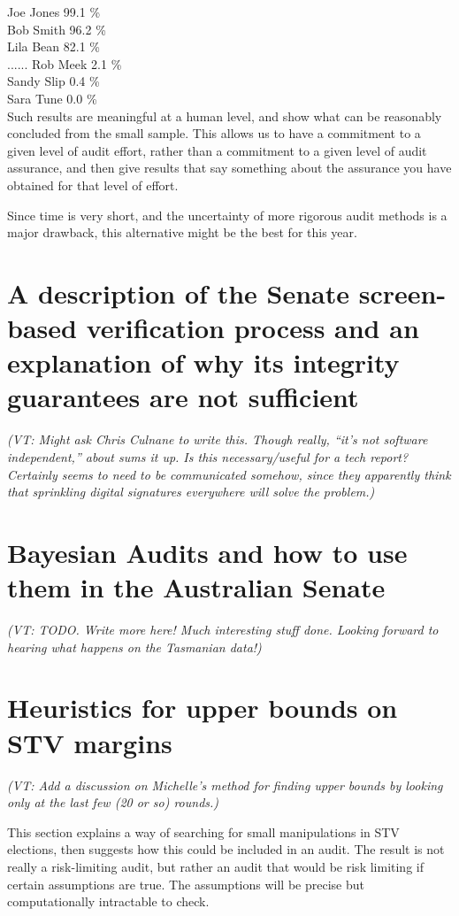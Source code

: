 \documentclass[10pt,a4paper]{article}
\newcommand{\VTNote}[1]{{\it(VT: #1)}}
\begin{document}
Joe Jones     99.1 \% \\
Bob Smith     96.2 \% \\
Lila Bean       82.1 \% \\
......
Rob Meek        2.1 \% \\ 
Sandy Slip       0.4 \%   \\
Sara Tune        0.0 \%   \\

Such results are meaningful at a human level, and show
what can be reasonably concluded from the small sample.
This allows us to have a commitment to a given
level of audit effort, rather than a commitment to a given level
of audit assurance, and then give results that say something about
the assurance you have obtained for that level of effort.

Since time is very short, and the uncertainty of more rigorous audit methods is a major drawback, this alternative might be the best for this year.

\section{A description of the Senate screen-based verification process and an explanation of why its integrity guarantees are not sufficient}
\VTNote{Might ask Chris Culnane to write this.  Though really, ``it's not software independent,'' about sums it up.  Is this necessary/useful for a tech report?  Certainly seems to need to be communicated somehow, since they apparently think that sprinkling digital signatures everywhere will solve the problem.}

\section{Bayesian Audits and how to use them in the Australian Senate}
\VTNote{TODO.  Write more here!  Much interesting stuff done.  Looking forward to hearing what happens on the Tasmanian data!}


\section{Heuristics for upper bounds on STV margins}
\VTNote{Add a discussion on Michelle's method for finding upper bounds by looking only at the last few (20 or so) rounds.}

This section explains a way of searching for small manipulations in STV elections, then suggests how this could be included in an audit.  The result is not really a risk-limiting audit, but rather an audit that would be risk limiting if certain assumptions are true.  The assumptions will be precise but computationally intractable to check. 
\end{document}
